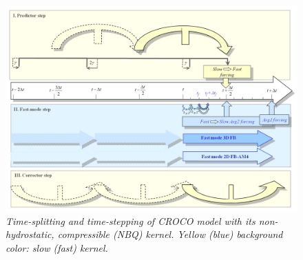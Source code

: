 \begin{figure}[!h]
	\centering		
		\includegraphics[width=1\linewidth]{CHAP2/Model_TS.png}
\caption[Time-splitting and time-stepping of CROCO model with its non-hydrostatic, compressible (NBQ) kernel.]{\textit{Time-splitting and time-stepping of CROCO model with its non-hydrostatic, compressible (NBQ) kernel. Yellow (blue) background color: slow (fast) kernel. }}
	\label{ModelTS}
\end{figure}
%

